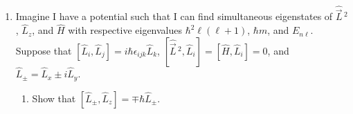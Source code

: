 \documentclass[../psets.tex]{subfiles}
\begin{document}
\begin{enumerate}
\begin{enumerate}
\begin{proof}
\begin{align*}
                &= -\frac{i\hbar\hat{p}_x\hat{p}_y}{m}+\frac{i\hbar\hat{p}_x\hat{p}_y}{m}+i\hbar\dv{V(u)}{u}\left[ x\pdv{y}(\sqrt{x^2+y^2})-y\pdv{x}(\sqrt{x^2+y^2}) \right]\\
                &= 0
            \end{align*}
            so  None of the other angular momentum directions are conserved because we need the cross partial derivatives to cancel as they do above, and that doesn't occur anywhere else.\par
            Additionally, observe that
            \begin{equation*}
                \left[ \hat{V}(\sqrt{x^2+y^2}),\hat{p}_z \right]f = -i\hbar V(\sqrt{x^2+y^2})\pdv{f}{z}+i\hbar\pdv{z}(V(\sqrt{x^2+y^2})f) = 0
            \end{equation*}
            Therefore,
            \begin{align*}
                [\hat{H},\hat{p}_z] &= \left[ \frac{\hat{p}_x^2+\hat{p}_y^2+\hat{p}_z^2}{2m}+\hat{V}(\sqrt{x^2+y^2}),\hat{p}_z \right]\\
                &= \left[ \frac{\hat{p}_z^2}{2m},\hat{p}_z \right]+\left[ \hat{V}(\sqrt{x^2+y^2}),\hat{p}_z \right]\\
                &= 0
            \end{align*}
            so  None of the other momentum directions are conserved either because we need the right commutator in line 2 to cancel as proven above, and it does not in any other case as proven above with the representative example of $\hat{p}_y$.
        \end{proof}
    \end{enumerate}
    \item Imagine I have a potential such that I can find simultaneous eigenstates of $\hat{\vec{L}}{\,}^2$, $\hat{L}_z$, and $\hat{H}$ with respective eigenvalues $\hbar^2\ell(\ell+1)$, $\hbar m$, and $E_{n\ell}$. Suppose that $[\hat{L}_i,\hat{L}_j]=i\hbar\epsilon_{ijk}\hat{L}_k$, $[\hat{\vec{L}}{\,}^2,\hat{L}_i]=[\hat{H},\hat{L}_i]=0$, and $\hat{L}_\pm=\hat{L}_x\pm i\hat{L}_y$.
    \begin{enumerate}
        \item Show that $[\hat{L}_\pm,\hat{L}_z]=\mp\hbar\hat{L}_\pm$.

\end{enumerate}
\end{enumerate}
\end{document}
